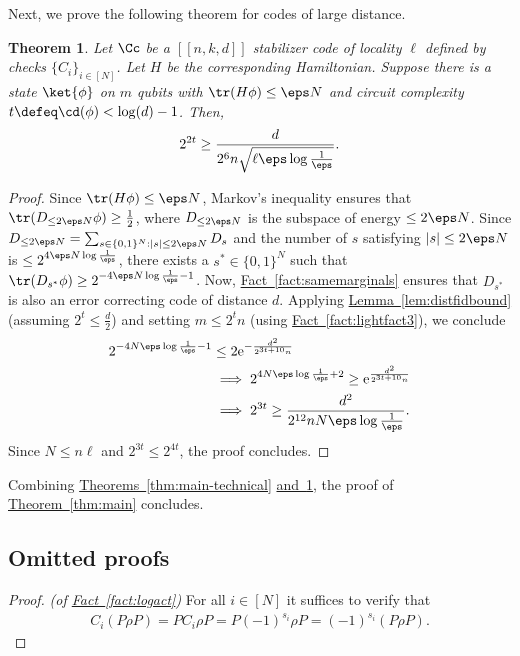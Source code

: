 \documentclass[11pt]{article}
\newcommand{\expref}[2]{\texorpdfstring{\hyperref[#2]{#1~\ref{#2}}}{#1~\ref{#2}}}
\newtheorem{theorem}{Theorem}[section]
\newcommand{\eee}{\mathrm e}
\begin{document}
Next, we prove the following theorem for codes of large distance.
\begin{theorem}
\label{thm:distance_clb}
Let $\Cc$ be a $[[n,k,d]]$ stabilizer code of locality $\ell$ defined by checks $\{C_i\}_{i \in [N]}$. Let $H$ be the corresponding Hamiltonian. Suppose there is a state $\ket{\phi}$ on $m$ qubits with $\tr(H\phi) \leq \eps N$ and circuit complexity $t \defeq \cd(\phi) < \log(d) - 1$. Then, 
\begin{align}
2^{2t} \geq \frac{d}{2^{6}n\sqrt{\ell\eps \log\frac{1}{\eps}}}.
\end{align}

\end{theorem}
\begin{proof}
Since $\tr(H\phi) \leq \eps N$, Markov's inequality ensures that $\tr(D_{\leq 2\eps N}\phi) \geq \frac{1}{2}$, where $D_{\leq 2\eps N}$ is the subspace of energy $\leq 2\eps N$. Since $D_{\leq 2\eps N} = \sum_{s\in \{0,1\}^N: |s|\leq 2\eps N} D_s$ and the number of $s$ satisfying $|s|\leq 2\eps N$ is $\leq 2^{4\eps N \log \frac{1}{\eps}}$, there exists a $s^*\in \{0,1\}^N$ such that $\tr(D_{s^*}\phi) \geq 2^{-4\eps N \log \frac{1}{\eps}-1}$. Now, \expref{Fact}{fact:samemarginals} ensures that $D_{s^*}$ is also an error correcting code of distance $d$. Applying \expref{Lemma}{lem:distfidbound} (assuming $2^t\leq \frac{d}{2}$) and setting $m\leq 2^t n$ (using \expref{Fact}{fact:lightfact3}), we conclude
\begin{align}
2^{-4N \eps \log \frac{1}{\eps}-1} &\leq  2\eee^{-\frac{d^2}{2^{3t+10}n}} \\
&\implies 2^{4N \eps \log \frac{1}{\eps}+2} \geq  \eee^{\frac{d^2}{2^{3t+10}n}} \\
&\implies 2^{3t}\geq \frac{d^2}{2^{12}nN\eps \log\frac{1}{\eps}}.
\end{align}
Since $N\leq n\ell$ and $2^{3t}\leq 2^{4t}$, the proof concludes.
\end{proof}
Combining \expref{Theorems}{thm:main-technical} \expref{and}{thm:distance_clb}, the proof of \expref{Theorem}{thm:main} concludes.
%
%
%
%
%
%
%
%

\subsection{Omitted proofs}

\begin{proof}\textit{(of \expref{Fact}{fact:logact})}
For all $i \in [N]$ it suffices to verify that
\begin{align}
C_i (P \rho P) = P C_i \rho P = P (-1)^{s_i} \rho P = (-1)^{s_i} (P \rho P).
\end{align}
\end{proof}
\end{document}
